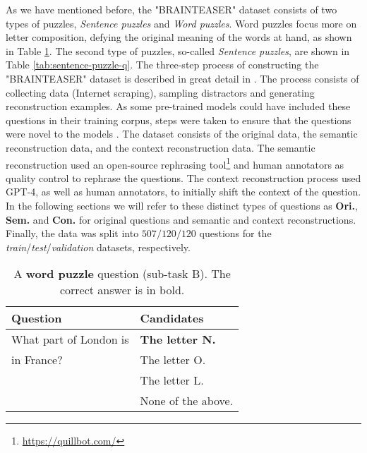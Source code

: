 As we have mentioned before, the "BRAINTEASER" dataset consists of two types of puzzles, \textit{Sentence puzzles} and \textit{Word puzzles}.
Word puzzles focus more on letter composition, defying the original meaning of the words at hand, as shown in Table \ref{tab:word-puzzle-q}.
The second type of puzzles, so-called \textit{Sentence puzzles}, are shown in Table \ref{tab:sentence-puzzle-q}.
The three-step process of constructing the "BRAINTEASER" dataset is described in great detail in \citep{semeval}.
The process consists of collecting data (Internet scraping), sampling distractors and generating reconstruction examples.
As some pre-trained models could have included these questions in their training corpus, steps were taken to ensure that the questions were novel to the models \cite{fine-tune}.
The dataset consists of the original data, the semantic reconstruction data, and the context reconstruction data.
The semantic reconstruction used an open-source rephrasing tool\footnote[2]{\url{https://quillbot.com/}} and human annotators as quality control to rephrase the questions. The context reconstruction process used GPT-4, as well as human annotators, to initially shift the context of the question.
In the following sections we will refer to these distinct types of questions as \textbf{Ori.}, \textbf{Sem.} and \textbf{Con.} for original questions and semantic and context reconstructions.
Finally, the data was split into $507/120/120$ questions for the \textit{train}/\textit{test}/\textit{validation} datasets, respectively.
\begin{table}
	\caption{A \textbf{word puzzle} question (sub-task B). The correct answer is in bold.}
	\label{tab:word-puzzle-q}
	\begin{center}
		\begin{tabular}{p{3.5cm}|p{3.5cm}}
			\toprule
			Question               & Candidates             \\
			\midrule
			What part of London is & \textbf{The letter N.} \\
			in France?             & The letter O.          \\
			                       & The letter L.          \\
			                       & None of the above.     \\
			\bottomrule
		\end{tabular}
	\end{center}
\end{table}

